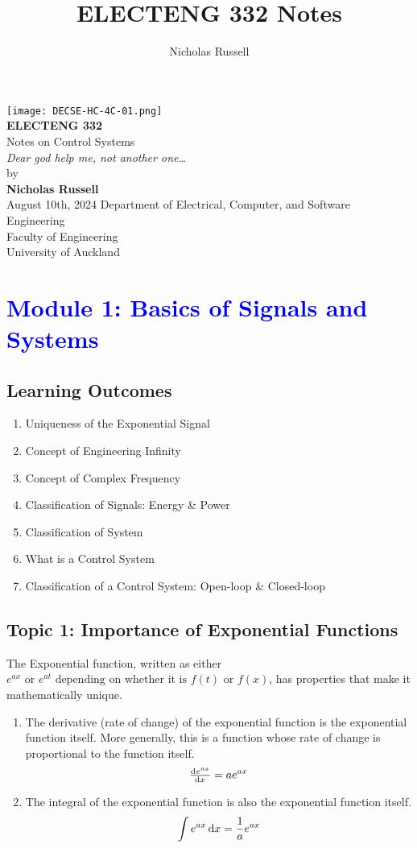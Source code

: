 \documentclass[12pt]{report}
\title{ELECTENG 332 Notes}
\author{Nicholas Russell}
\begin{document}
\begin{titlepage}
\centering
\texttt{[image: DECSE-HC-4C-01.png]}\\[1cm] %
{\LARGE \textbf{ELECTENG 332}}\\[0.5cm]
{\Large Notes on Control Systems}\\[0.5cm]
{\textit{Dear god help me, not another one\dots\ }}\\[2cm]
{\large by}\\[0.3cm]
{\large \textbf{Nicholas Russell}}\\[1.4cm]
{\large August 10th, 2024}
\vfill %
{\large Department of Electrical, Computer, and Software Engineering}\\[0.3cm]
{\large Faculty of Engineering}\\[0.3cm]
{\large University of Auckland}
\end{titlepage}
\tableofcontents
\newpage
\chapter{\textcolor{blue}{Module 1: Basics of Signals and Systems}}
\section*{Learning Outcomes}
\begin{enumerate}[label=\blacktriangleright, leftmargin=*, itemsep=0.5em]
    \item Uniqueness of the Exponential Signal
    \item Concept of Engineering Infinity
    \item Concept of Complex Frequency
    \item Classification of Signals: Energy \& Power
    \item Classification of System
    \item What is a Control System
    \item Classification of a Control System: Open-loop \& Closed-loop
\end{enumerate}
\section{Topic 1: Importance of Exponential Functions}
The Exponential function, written as either
\(e^{ax}\text{ or }e^{at}\text{ depending on whether it is }f(t)\text{ or }f(x)\),
has properties that make it mathematically unique.
\begin{enumerate}
    \item The derivative (rate of change) of the exponential function is the exponential function itself. More generally, this is a function whose rate of change is proportional to the function itself.
    \[
        \od{e^{ax}}{x} = ae^{ax}
    \]
    \item The integral of the exponential function is also the exponential function itself.
    \[
        \int e^{ax} \dif x = \frac{1}{a}e^{ax}
    \]
\end{enumerate}
\end{document}
